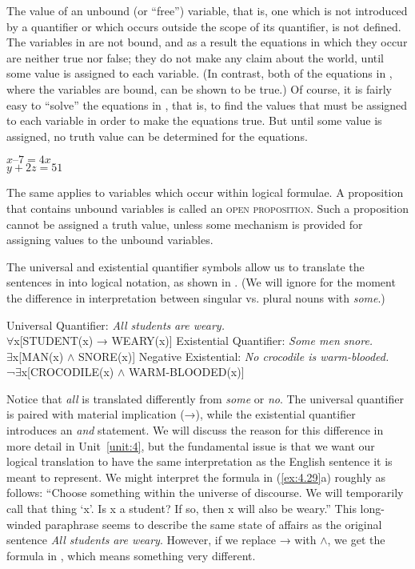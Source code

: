 The value of an unbound (or “free”) variable, that is, one which is not introduced by a quantifier or which occurs outside the scope of its quantifier, is not defined. The variables in  are not bound, and as a result the equations in which they occur are neither true nor false; they do not make any claim about the world, until some value is assigned to each variable. (In contrast, both of the equations in , where the variables are bound, can be shown to be true.) Of course, it is fairly easy to “solve” the equations in , that is, to find the values that must be assigned to each variable in order to make the equations true. But until some value is assigned, no truth value can be determined for the equations.


\ea \label{ex:4.28}
\ea  $x–7 = 4x$\\
\ex  $y+2z = 51$
                       \z
\z


The same applies to variables which occur within logical formulae. A proposition that contains unbound variables is called an \textsc{open proposition}. Such a proposition cannot be assigned a truth value, unless some mechanism is provided for assigning values to the unbound variables.



The universal and existential quantifier symbols allow us to translate the sentences in  into logical notation, as shown in . (We will ignore for the moment the difference in interpretation between singular vs. plural nouns with \textit{some}.)


\ea \label{ex:4.29}
\ea  Universal Quantifier: \textit{All students} \textit{are weary.}\\
${\forall}$x[STUDENT(x) → WEARY(x)]
\ex  Existential Quantifier: \textit{Some men} \textit{snore.}\\
${\exists}$x[MAN(x) $\wedge$ SNORE(x)]
\ex  Negative Existential: \textit{No crocodile is warm-blooded.}\\
¬${\exists}$x[CROCODILE(x) $\wedge$ WARM-BLOODED(x)]
\z \z

Notice that \textit{all} is translated differently from \textit{some} or \textit{no}. The universal quantifier is paired with material implication (→), while the existential quantifier introduces an \textit{and} statement. We will discuss the reason for this difference in more detail in Unit~\ref{unit:4}, but the fundamental issue is that we want our logical translation to have the same interpretation as the English sentence it is meant to represent. We might interpret the formula in (\ref{ex:4.29}a) roughly as follows: “Choose something within the universe of discourse. We will temporarily call that thing ‘x’. Is x a student? If so, then x will also be weary.” This long-winded paraphrase seems to describe the same state of affairs as the original sentence \textit{All students} \textit{are weary}. However, if we replace → with $\wedge$, we get the formula in , which means something very different.

